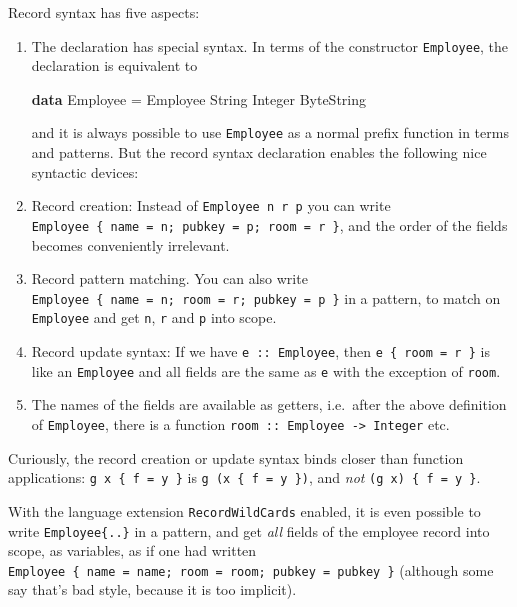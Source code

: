 \documentclass[11pt,
  american,
  DIV13]{article}
\newenvironment{Shaded}{}{}
\newcommand{\DataTypeTok}[1]{\textcolor[rgb]{0.56,0.13,0.00}{#1}}
\newcommand{\KeywordTok}[1]{\textcolor[rgb]{0.00,0.44,0.13}{\textbf{#1}}}
\newcommand{\OtherTok}[1]{\textcolor[rgb]{0.00,0.44,0.13}{#1}}
\begin{document}
Record syntax has five aspects:

\begin{enumerate}
\def\labelenumi{\arabic{enumi}.}
\item
  The declaration has special syntax. In terms of the constructor
  \texttt{Employee}, the declaration is equivalent to

\begin{Shaded}
\begin{Highlighting}[]
\KeywordTok{data} \DataTypeTok{Employee} \OtherTok{=} \DataTypeTok{Employee} \DataTypeTok{String} \DataTypeTok{Integer} \DataTypeTok{ByteString}
\end{Highlighting}
\end{Shaded}

  and it is always possible to use \texttt{Employee} as a normal prefix
  function in terms and patterns. But the record syntax declaration
  enables the following nice syntactic devices:
\item
  Record creation: Instead of \texttt{Employee\ n\ r\ p} you can write
  \texttt{Employee\ \{\ name\ =\ n;\ pubkey\ =\ p;\ room\ =\ r\ \}}, and
  the order of the fields becomes conveniently irrelevant.
\item
  Record pattern matching. You can also write
  \texttt{Employee\ \{\ name\ =\ n;\ room\ =\ r;\ pubkey\ =\ p\ \}} in a
  pattern, to match on \texttt{Employee} and get \texttt{n}, \texttt{r}
  and \texttt{p} into scope.
\item
  Record update syntax: If we have \texttt{e\ ::\ Employee}, then
  \texttt{e\ \{\ room\ =\ r\textquotesingle{}\ \}} is like an
  \texttt{Employee} and all fields are the same as \texttt{e} with the
  exception of \texttt{room}.
\item
  The names of the fields are available as getters, i.e.~after the above
  definition of \texttt{Employee}, there is a function
  \texttt{room\ ::\ Employee\ -\textgreater{}\ Integer} etc.
\end{enumerate}

Curiously, the record creation or update syntax binds closer than
function applications: \texttt{g\ x\ \{\ f\ =\ y\ \}} is
\texttt{g\ (x\ \{\ f\ =\ y\ \})}, and \emph{not}
\texttt{(g\ x)\ \{\ f\ =\ y\ \}}.

With the language extension \texttt{RecordWildCards} enabled, it is even
possible to write \texttt{Employee\{..\}} in a pattern, and get
\emph{all} fields of the employee record into scope, as variables, as if
one had written
\texttt{Employee\ \{\ name\ =\ name;\ room\ =\ room;\ pubkey\ =\ pubkey\ \}}
(although some say that's bad style, because it is too implicit).
\end{document}
